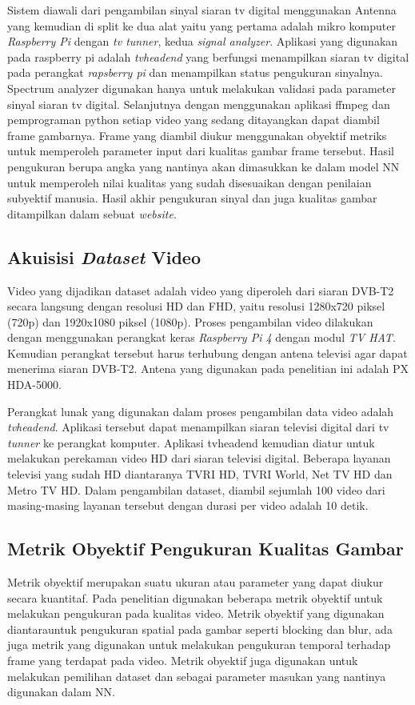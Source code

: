 Sistem diawali dari pengambilan sinyal siaran tv digital menggunakan Antenna yang kemudian di split ke dua alat yaitu yang pertama adalah mikro komputer \textit{Raspberry Pi }dengan \textit{tv tunner}, kedua \textit{signal analyzer}. Aplikasi yang digunakan pada raspberry pi adalah \textit{tvheadend} yang berfungsi menampilkan siaran tv digital pada perangkat \textit{rapsberry pi} dan menampilkan status pengukuran sinyalnya. Spectrum analyzer digunakan hanya untuk melakukan validasi pada parameter sinyal siaran tv digital. Selanjutnya dengan menggunakan aplikasi ffmpeg dan pemprograman python setiap video yang sedang ditayangkan dapat diambil frame gambarnya. Frame yang diambil diukur menggunakan obyektif metriks untuk memperoleh parameter input dari kualitas gambar frame tersebut. Hasil pengukuran berupa angka yang nantinya akan dimasukkan ke dalam model NN untuk memperoleh nilai kualitas yang sudah disesuaikan dengan penilaian subyektif manusia. Hasil akhir pengukuran sinyal dan juga kualitas gambar ditampilkan dalam sebuat \textit{website}.

\subsection{Akuisisi \textit{Dataset} Video}
\hspace{1,2cm}
Video yang dijadikan dataset adalah video yang diperoleh dari siaran DVB-T2 secara langsung dengan resolusi HD dan FHD, yaitu resolusi 1280x720 piksel (720p) dan 1920x1080 piksel (1080p). Proses pengambilan video dilakukan dengan menggunakan perangkat keras \textit{Raspberry Pi 4} dengan modul \textit{TV HAT}. Kemudian perangkat tersebut harus terhubung dengan antena televisi agar dapat menerima siaran DVB-T2. Antena yang digunakan pada penelitian ini adalah PX HDA-5000. 

Perangkat lunak yang digunakan dalam proses pengambilan data video adalah \textit{tvheadend}. Aplikasi tersebut dapat menampilkan siaran televisi digital dari tv \textit{tunner} ke perangkat komputer. Aplikasi tvheadend kemudian diatur untuk melakukan perekaman video HD dari siaran televisi digital. Beberapa layanan televisi yang sudah HD diantaranya TVRI HD, TVRI World, Net TV HD dan Metro TV HD. Dalam pengambilan dataset, diambil sejumlah 100 video dari masing-masing layanan tersebut dengan durasi per video adalah 10 detik. 


\subsection{Metrik Obyektif Pengukuran Kualitas Gambar}
\hspace{1,2cm}
Metrik obyektif merupakan suatu ukuran atau parameter yang dapat diukur secara kuantitaf. Pada penelitian digunakan beberapa metrik obyektif untuk melakukan pengukuran pada kualitas video. Metrik obyektif yang digunakan diantarauntuk pengukuran spatial pada gambar seperti  blocking  dan blur, ada juga metrik yang digunakan untuk melakukan pengukuran temporal terhadap frame yang terdapat pada video. Metrik obyektif  juga digunakan untuk melakukan pemilihan dataset dan sebagai parameter masukan yang nantinya digunakan dalam NN.

